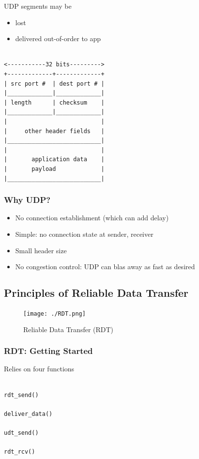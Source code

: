 \documentclass[11pt]{article}
\begin{document}
UDP segments may be
\begin{itemize}
\item lost
\item delivered out-of-order to app
\end{itemize}


\begin{verbatim}

<-----------32 bits--------->
+-------------+-------------+
| src port #  | dest port # |
|_____________|_____________|
| length      | checksum    |
|_____________|_____________|
|                           |
|     other header fields   |
|___________________________|
|                           |
|       application data    |   
|       payload             |
|___________________________|

\end{verbatim}

\subsubsection{Why UDP?}
\label{sec:org208a819}
\begin{itemize}
\item No connection establishment (which can add delay)
\item Simple: no connection state at sender, receiver
\item Small header size
\item No congestion control: UDP can blas away as fast as desired
\end{itemize}

\subsection{Principles of Reliable Data Transfer}
\label{sec:orga24df43}

\begin{figure}[htbp]
\centering
\texttt{[image: ./RDT.png]}
\caption{Reliable Data Transfer (RDT)}
\end{figure}

\subsubsection{RDT: Getting Started}
\label{sec:org49190a4}

Relies on four functions

\begin{verbatim}

rdt_send()

deliver_data()

udt_send()

rdt_rcv()

\end{verbatim}
\end{document}
